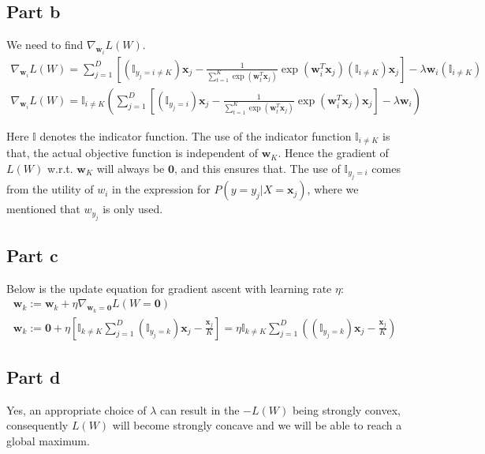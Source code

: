 \documentclass{article}
\newcommand{\xbold}{\mathbf{x}}
\newcommand{\wbold}{\mathbf{w}}
\newcommand{\ind}{\mathbb{I}}
\begin{document}
\subsection*{Part b}
\begin{flushleft}
We need to find \(\nabla_{\wbold_{i}} L(W)\).
\begin{gather}
\nabla_{\wbold_{i}} L(W) = \sum_{j=1}^{D} \left[\left(\ind_{y_{j} = i \neq K}\right) \xbold_{j} - \frac{1}{\displaystyle \sum_{t=1}^{K}\exp(\wbold_{t}^{T}\xbold_{j})} \exp(\wbold_{i}^{T}\xbold_{j}) \left(\ind_{i \neq K}\right) \xbold_{j}\right] - \lambda \wbold_{i} \left(\ind_{i \neq K}\right) \\
\nabla_{\wbold_{i}} L(W) = \ind_{i \neq K} \left(\sum_{j=1}^{D} \left[ \left(\ind_{y_{j} = i}\right) \xbold_{j} - \frac{1}{\displaystyle \sum_{t=1}^{K}\exp(\wbold_{t}^{T}\xbold_{j})} \exp(\wbold_{i}^{T}\xbold_{j}) \xbold_{j}\right] - \lambda \wbold_{i} \right)
\end{gather}

Here \(\ind\) denotes the indicator function. The use of the indicator function \(\ind_{i \neq K}\) is that, the actual objective function is independent of \(\wbold_{K}\). Hence the gradient of \(L(W)\) w.r.t. \(\wbold_{K}\) will always be \(\mathbf{0}\), and this ensures that. The use of \(\ind_{y_{j} = i}\) comes from the utility of \(w_{i}\) in the expression for \(P(y = y_{j} | X = \xbold_{j})\), where we mentioned that \(w_{y_{j}}\) is only used.
\end{flushleft}

\subsection*{Part c}
Below is the update equation for gradient ascent with learning rate \(\eta\):
\begin{gather}
\wbold_{k} := \wbold_{k} + \eta \nabla_{\wbold_{k} = \mathbf{0}}L(W = \mathbf{0}) \\
\wbold_{k} := \mathbf{0} + \eta \left[\ind_{k \neq K} \displaystyle \sum_{j=1}^{D} \left(\ind_{y_{j} = k}\right)\xbold_{j} - \frac{\xbold_{j}}{K}\right] = \eta \ind_{k \neq K} \displaystyle \sum_{j=1}^{D} \left(\left(\ind_{y_{j} = k}\right)\xbold_{j} - \frac{\xbold_{j}}{K}\right)
\end{gather}

\subsection*{Part d}
Yes, an appropriate choice of \(\lambda\) can result in the \(-L(W)\) being strongly convex, consequently \(L(W)\) will become strongly concave and we will be able to reach a global maximum.
\end{document}
